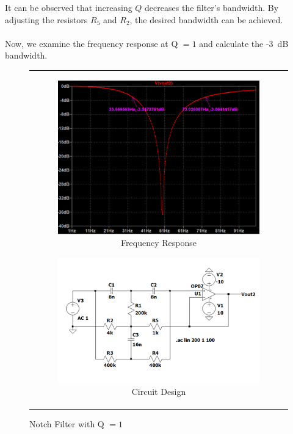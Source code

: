 \documentclass[hidelinks,12pt]{article}
\begin{document}
	It can be observed that increasing \( Q \) decreases the filter's bandwidth. By adjusting the resistors \( R_5 \) and \( R_2 \), the desired bandwidth can be achieved.
	\\ \\
	Now, we examine the frequency response at Q \( = 1 \) and calculate the -3~dB bandwidth.

	\begin{figure}[!h]
		\centering
			\begin{tabular}{c}
				\begin{subfigure}[t]{0.45\textwidth}
					\centering
					\includegraphics[width=\textwidth]{figures/Notch Filter Design/fre_response_q_1}
					\caption{Frequency Response}
				\end{subfigure}
				\hfill
				\begin{subfigure}[t]{0.5\textwidth}
					\centering
					\includegraphics[width=\textwidth]{figures/Notch Filter Design/q_1_circuit_design}
					\caption{Circuit Design}
				\end{subfigure} \\
			\end{tabular}
		\caption{Notch Filter with Q \( = 1 \)}
	\end{figure}
\end{document}
